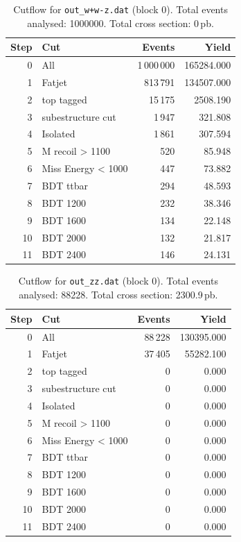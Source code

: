 \documentclass{article}
\begin{document}
\begin{table}[H]
\centering
\begin{tabular}{r l r r}
\toprule
Step & Cut & Events & Yield \\
\midrule
0 & All & 1\,000\,000 & 165284.000 \\
1 & Fatjet & 813\,791 & 134507.000 \\
2 & top tagged & 15\,175 & 2508.190 \\
3 & subestructure cut & 1\,947 & 321.808 \\
4 & Isolated & 1\,861 & 307.594 \\
5 & M recoil > 1100 & 520 & 85.948 \\
6 & Miss Energy < 1000 & 447 & 73.882 \\
7 & BDT ttbar & 294 & 48.593 \\
8 & BDT 1200 & 232 & 38.346 \\
9 & BDT 1600 & 134 & 22.148 \\
10 & BDT 2000 & 132 & 21.817 \\
11 & BDT 2400 & 146 & 24.131 \\
\bottomrule
\end{tabular}
\caption{Cutflow for \texttt{out\_w+w-z.dat} (block 0). Total events analysed: 1000000. Total cross section: 0\,pb.}
\label{tab:cutflow-out-w-w-z-dat}
\end{table}

\begin{table}[H]
\centering
\begin{tabular}{r l r r}
\toprule
Step & Cut & Events & Yield \\
\midrule
0 & All & 88\,228 & 130395.000 \\
1 & Fatjet & 37\,405 & 55282.100 \\
2 & top tagged & 0 & 0.000 \\
3 & subestructure cut & 0 & 0.000 \\
4 & Isolated & 0 & 0.000 \\
5 & M recoil > 1100 & 0 & 0.000 \\
6 & Miss Energy < 1000 & 0 & 0.000 \\
7 & BDT ttbar & 0 & 0.000 \\
8 & BDT 1200 & 0 & 0.000 \\
9 & BDT 1600 & 0 & 0.000 \\
10 & BDT 2000 & 0 & 0.000 \\
11 & BDT 2400 & 0 & 0.000 \\
\bottomrule
\end{tabular}
\caption{Cutflow for \texttt{out\_zz.dat} (block 0). Total events analysed: 88228. Total cross section: 2300.9\,pb.}
\label{tab:cutflow-out-zz-dat}
\end{table}
\end{document}
